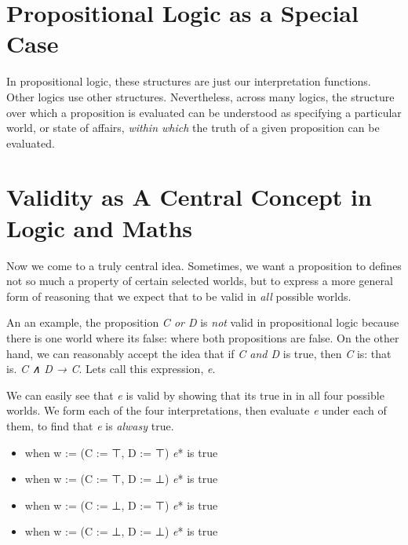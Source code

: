 \documentclass{book}
\providecommand{\tightlist}{%
  \setlength{\itemsep}{0pt}\setlength{\parskip}{0pt}}
\begin{document}
\hypertarget{pandoc.profile.debug__pandoc__debug__src__modeltheory.md__propositional-logic-as-a-special-case}{%
\section*{Propositional Logic as a Special Case}\label{pandoc.profile.debug__pandoc__debug__src__modeltheory.md__propositional-logic-as-a-special-case}}

In propositional logic, these structures are just
our interpretation functions. Other logics use
other structures. Nevertheless, across many logics,
the structure over which a proposition is evaluated
can be understood as specifying a particular world,
or state of affairs, \emph{within which} the truth of a
given proposition can be evaluated.

\hypertarget{pandoc.profile.debug__pandoc__debug__src__modeltheory.md__validity-as-a-central-concept-in-logic-and-maths}{%
\section*{Validity as A Central Concept in Logic and Maths}\label{pandoc.profile.debug__pandoc__debug__src__modeltheory.md__validity-as-a-central-concept-in-logic-and-maths}}

Now we come to a truly central idea. Sometimes, we
want a proposition to defines not so much a property of certain selected worlds, but to express a more general form of reasoning that we expect that to be valid in \emph{all} possible worlds.

An an example, the proposition \emph{C or D} is \emph{not}
valid in propositional logic because there is one
world where it\textquotesingle s false: where both propositions are false. On the other hand, we can reasonably accept the
idea that if \emph{C and D} is true, then \emph{C} is: that is. \emph{C ∧ D → C}. Let\textquotesingle s call this expression, \emph{e}.

We can easily see that \emph{e} is valid by showing that it\textquotesingle s true in in all four possible worlds. We form each of the four interpretations, then evaluate \emph{e} under each of them, to find that \emph{e} is \emph{alwasy} true.

\begin{itemize}
\tightlist
\item
  when w := (C := ⊤, D := ⊤) \emph{e}* is true
\item
  when w := (C := ⊤, D := ⊥) \emph{e}* is true
\item
  when w := (C := ⊥, D := ⊤) \emph{e}* is true
\item
  when w := (C := ⊥, D := ⊥) \emph{e}* is true
\end{itemize}
\end{document}
